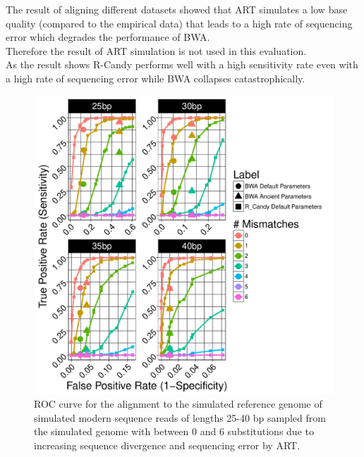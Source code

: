 \documentclass[11pt,a4paper]{report}
\begin{document}
The result of aligning different datasets showed that ART simulates a
low base quality (compared to the empirical data) that leads to 
a high rate of sequencing error which degrades the performance of BWA.\\
Therefore the result of ART simulation is not used in this evaluation. \\

As the result shows R-Candy performs well with a high sensitivity rate 
even with a high rate of sequencing error while BWA collapses catastrophically.\\

\begin{figure}[H]
\centering
\includegraphics[width=12cm]{pictures/f_DS3_ART.pdf}
\caption{
ROC curve for the alignment to the simulated reference genome of simulated modern 
sequence reads of lengths 25-40 bp sampled from the simulated genome with between 
0 and 6 substitutions due to increasing sequence divergence and sequencing error by ART.}
\label{DS3_ART}
\end{figure}
\end{document}
